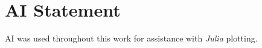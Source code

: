 \documentclass[a4paper,12pt]{article}
\begin{document}
% 

\clearpage
\newpage
\printbibliography[heading=bibintoc, title={References}]

\newpage
\appendix

\section{AI Statement}
\label{app:ai-statement}


AI was used throughout this work for assistance with \textit{Julia} plotting.
\end{document}

